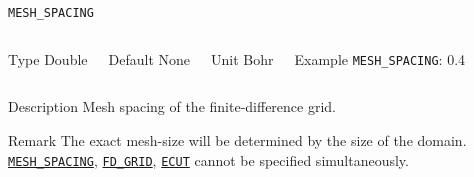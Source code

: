 \documentclass[xcolor=dvipsnames,t]{beamer}
\begin{document}
\begin{frame}[allowframebreaks]{\texttt{MESH\_SPACING}} \label{MESH_SPACING}
\vspace*{-12pt}
\begin{columns}
\begin{block}{Type}
Double
\end{block}

\begin{block}{Default}
None
\end{block}

\begin{block}{Unit}
Bohr
\end{block}

\begin{block}{Example}
\texttt{MESH\_SPACING}: 0.4
\end{block}
\end{columns}

\begin{block}{Description}
Mesh spacing of the finite-difference grid. 
\end{block}

\begin{block}{Remark}
The exact mesh-size will be determined by the size of the domain.  \hyperlink{MESH_SPACING}{\texttt{MESH\_SPACING}}, \hyperlink{FD_GRID}{\texttt{FD\_GRID}}, \hyperlink{ECUT}{\texttt{ECUT}} cannot be specified simultaneously.
\end{block}

\end{frame}
\end{document}
